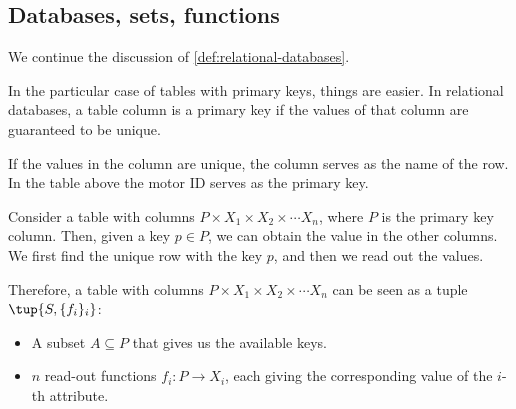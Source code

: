 \label{sec:specialization}

\subsection{Databases, sets, functions}

We continue the discussion of \cref{def:relational-databases}.

In the particular case of tables with primary keys,
things are easier. In relational databases, 
a table column is a primary key if the values of that column are guaranteed to be unique.

If the values in the column are unique, the column serves as the name of the row. In the table 
above the motor ID serves as the primary key.

Consider a table with columns $P \times X_1 \times X_2 \times \cdots X_n$,
where $P$ is the primary key column. Then, given a key $p \in P$,
we can obtain the value in the other columns. We first find the unique
row with the key $p$, and then we read out the values. 

Therefore, a table with columns $P \times X_1 \times X_2 \times \cdots X_n$
can be seen as a tuple $\tup{S, \{f_i\}_i}$:
\begin{itemize}
    \item A subset $A \subseteq P$ that gives us the available keys.
    \item $n$ read-out functions $f_i: P \to X_i$, each giving the 
    corresponding value of the $i$-th attribute.
\end{itemize}




\begin{comment}
\begin{table}[h]
    \centering
    \begin{tabular}{c|c|c|c|c|c}
         Motor ID & Company& Size & \unit[Weight]{[g]} & \unit[Max Power]{[W]} & \unit[price]{[USD]} \\
         \hline
         $\textsf{Model1}$&Company $\textsf{B}$ & 2 x 3 x 4& 10 & &259\\
         $\textsf{Model2}$&Company $\textsf{A}$ &2 x 3 x 4& 20 & &109\\
         $\textsf{Model3}$&Company $\textsf{B}$ &2 x 3 x 4& 5 & &124\\
         $\textsf{Model4}$&Company $\textsf{C}$ &2 x 3 x 4& 30 & &399\\
         $\textsf{Model5}$&Company $\textsf{A}$ &2 x 3 x 4& 45 & &245  \\
        $\textsf{Model6}$&Company $\textsf{D}$ & 2 x 3 x 4& 20 & &89\\
        $\textsf{Model7}$&Company $\textsf{B}$ & 2 x 3 x 4& 15 &&130
    \end{tabular}
    \caption{A simplified catalogue of motors.}
    \label{tab:electric_motors}
\end{table}
\end{comment}


